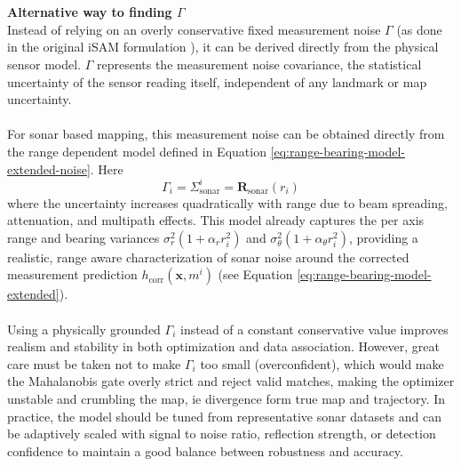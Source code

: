 \\ \\
\textbf{Alternative way to finding $\Gamma$}
\\ \noindent
Instead of relying on an overly conservative fixed measurement noise $\Gamma$ (as done in the original iSAM formulation \cite{iSAM_paper}), it can be derived directly from the physical sensor model. $\Gamma$ represents the measurement noise covariance, the statistical uncertainty of the sensor reading itself, independent of any landmark or map uncertainty.  
\\ \\
For sonar based mapping, this measurement noise can be obtained directly from the range dependent model defined in Equation \eqref{eq:range-bearing-model-extended-noise}. Here
$$
    \Gamma_i = \Sigma_{\text{sonar}}^i = \mathbf{R}_{\text{sonar}}(r_i)
$$
where the uncertainty increases quadratically with range due to beam spreading, attenuation, and multipath effects. This model already captures the per axis range and bearing variances $\sigma_r^2(1+\alpha_r r_i^2)$ and $\sigma_\theta^2(1+\alpha_\theta r_i^2)$, providing a realistic, range aware characterization of sonar noise around the corrected measurement prediction $h_{\text{corr}}(\mathbf{x}, m^i)$ (see Equation \ref{eq:range-bearing-model-extended}).   
\\ \\
Using a physically grounded $\Gamma_i$ instead of a constant conservative value improves realism and stability in both optimization and data association. However, great care must be taken not to make $\Gamma_i$ too small (overconfident), which would make the Mahalanobis gate overly strict and reject valid matches, making the optimizer unstable and crumbling the map, ie divergence form true map and trajectory. In practice, the model should be tuned from representative sonar datasets and can be adaptively scaled with signal to noise ratio, reflection strength, or detection confidence to maintain a good balance between robustness and accuracy.



